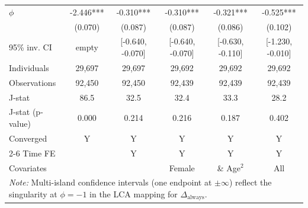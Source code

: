 \begin{tabular}{l ccccc}
\addlinespace
$\phi$              &      -2.446***&      -0.310***&      -0.310***&      -0.321***&      -0.525***\\
                    &     (0.070)   &     (0.087)   &     (0.087)   &     (0.086)   &     (0.102)   \\
95\% inv. CI        &       empty   &[-0.640, -0.070]   &[-0.640, -0.070]   &[-0.630, -0.110]   &[-1.230, -0.010]   \\
Individuals         &      29,697   &      29,697   &      29,692   &      29,692   &      29,692   \\
Observations        &      92,450   &      92,450   &      92,439   &      92,439   &      92,439   \\
J-stat              &        86.5   &        32.5   &        32.4   &        33.3   &        28.2   \\
J-stat (p-value)    &       0.000   &       0.214   &       0.216   &       0.187   &       0.402   \\
Converged           &           Y   &           Y   &           Y   &           Y   &           Y   \\
\cmidrule{2-6} Time FE & & Y & Y & Y & Y \\ Covariates & & & Female & \& Age$^2$ & All \\ \multicolumn{6}{p{\linewidth}}{\footnotesize \emph{Note:} Multi-island confidence intervals (one endpoint at $\pm\infty$) reflect the singularity at $\phi=-1$ in the LCA mapping for $\Delta_{\text{always}}$.} \\ \bottomrule \end{tabular}
